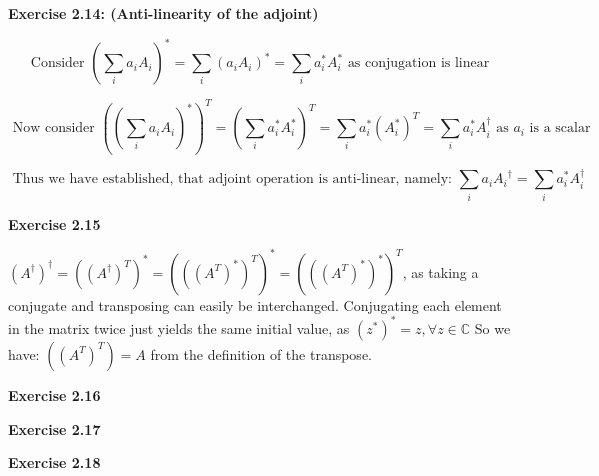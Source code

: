 \documentclass{article}
\begin{document}
\bigskip

\begin{framed}
    \noindent \textbf{Exercise 2.14: (Anti-linearity of the adjoint)}
    
    \medskip

    $$
    \text{Consider } (\sum_i{a_iA_i})^{*} = \sum_i{(a_iA_i)^{*}} = \sum_i{a_i^*A_i^*} \text{ as conjugation is linear}
    $$

    $$
    \text{ Now consider } ((\sum_i{a_iA_i})^{*})^{T} = (\sum_i{a_i^*A_i^*})^{T} = \sum_i{a_i^*(A_i^*)^{T}} = \sum_i{a_i^*A_i^{\dagger}}\text{ as } a_i \text{ is a scalar }
    $$

    $$
    \text{ Thus we have established, that adjoint operation is anti-linear, namely: } \sum_i{a_iA_i}^{\dagger} = \sum_i{a_i^{*}A_i^{\dagger}}
    $$
    
    
\end{framed}

\bigskip

\begin{framed}
    \noindent \textbf{Exercise 2.15}
    
    \medskip
    
    $(A^{\dagger})^{\dagger} = ((A^{\dagger})^{T})^{*} = (((A^{T})^{*})^{T})^{*} = (((A^{T})^{*})^{*})^{T}$, as taking a conjugate and transposing can easily be interchanged. Conjugating each element in the matrix twice just yields the same initial value, as $(z^{*})^{*} = z , \forall z \in \mathbb{C}$ So we have: $((A^T)^T) = A$ from the definition of the transpose. 
    
\end{framed}

\bigskip

\begin{framed}
    \noindent \textbf{Exercise 2.16}
    
    \medskip
    
    
\end{framed}

\bigskip

\begin{framed}
    \noindent \textbf{Exercise 2.17}
    
    \medskip
    
    
\end{framed}

\bigskip

\begin{framed}
    \noindent \textbf{Exercise 2.18}
    
    \medskip
    
    
\end{framed}
\end{document}
